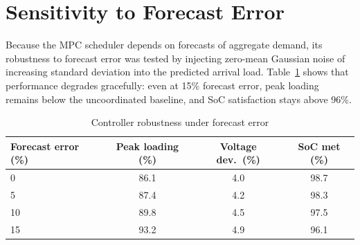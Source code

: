\section{Sensitivity to Forecast Error}
Because the MPC scheduler depends on forecasts of aggregate demand, its robustness to forecast
error was tested by injecting zero-mean Gaussian noise of increasing standard deviation into the
predicted arrival load. Table~\ref{tab:sensitivity} shows that performance degrades gracefully:
even at 15\% forecast error, peak loading remains below the uncoordinated baseline, and SoC
satisfaction stays above 96\%.

\begin{table}[htbp]
\centering
\caption{Controller robustness under forecast error}
\label{tab:sensitivity}
\begin{tabular}{@{}lccc@{}}
\toprule
\textbf{Forecast error (\%)} & \textbf{Peak loading (\%)} & \textbf{Voltage dev.\ (\%)} & \textbf{SoC met (\%)} \\
\midrule
0  & 86.1 & 4.0 & 98.7 \\
5  & 87.4 & 4.2 & 98.3 \\
10 & 89.8 & 4.5 & 97.5 \\
15 & 93.2 & 4.9 & 96.1 \\
\bottomrule
\end{tabular}
\end{table}
